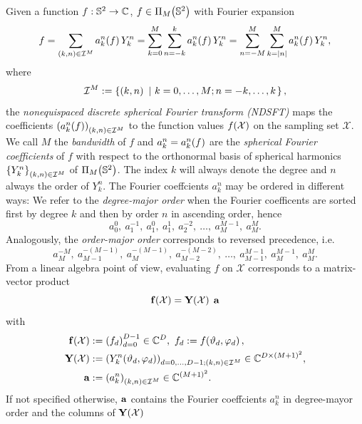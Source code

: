 Given a function $f: \mathbb{S}^2 \rightarrow \mathbb{C}$, $f \in \Pi_{M}{\hspace{-0.4ex}}\left(\mathbb{S}^2\right)$ with Fourier expansion
\begin{equation}
  \label{NFSFT:FourierExpansion} 
  f = \sum_{\left(k,n\right) \in\mathcal{I}^M} a_k^n{\hspace{-0.4ex}}\left(f\right) Y_{k}^n = \sum_{k=0}^M \sum_{n=-k}^k a_k^n{\hspace{-0.4ex}}\left(f\right) Y_{k}^n = \sum_{n=-M}^M \sum_{k=\left\vert n\right\vert}^M a_k^n{\hspace{-0.4ex}}\left(f\right) Y_{k}^n,
\end{equation}  
where 
$$\mathcal{I}^M := \left\{\left(k,n\right)\ \left|\ k=0,\ldots,M;n=-k,\ldots,k\right.\right\rbrace,$$
the \emph{nonequispaced discrete spherical Fourier transform (NDSFT)} maps the coefficients $\left(a_k^n{\hspace{-0.4ex}}\left(f\right)\right)_{(k,n) \in \mathcal{I}^M}$ to the function values $f{\hspace{-0.4ex}}\left(\mathcal{X}\right)$ on the sampling set $\mathcal{X}$.
We call $M$ the \emph{bandwidth} of $f$ and $a_{k}^n = a_{k}^n{\hspace{-0.4ex}}\left(f\right)$ are the \emph{spherical Fourier coefficients} of $f$ with respect to the 
orthonormal basis of spherical harmonics $\left\{Y_{k}^n\right\rbrace_{\left(k,n\right) \in\mathcal{I}^M}$ of $\Pi_{M}{\hspace{-0.4ex}}\left(\mathbb{S}^2\right)$. The index $k$ will always denote the degree and $n$ always the order of $Y_{k}^n$. The Fourier coeffcients $a_{k}^n$ may be ordered 
in different ways: We refer to the \emph{degree-major order} when the Fourier coefficents are sorted first by degree $k$ and then by order $n$ in ascending order, hence
$$ a_{0}^0,\: a_{1}^{-1},\: a_{1}^{0},\: a_{1}^{1},\: a_{2}^{-2},\: \ldots,\: a_{M}^{M-1},\: a_{M}^{M}.$$ 
Analogously, the \emph{order-major order} corresponds to reversed precedence, i.e.
$$ a_{M}^{-M},\: a_{M-1}^{-(M-1)},\: a_{M}^{-(M-1)},\: a_{M-2}^{-(M-2)},\: \ldots,\: a_{M-1}^{M-1},\: a_{M}^{M-1},\: a_{M}^{M}.$$ 
From a linear algebra point of view, evaluating $f$ on $\mathcal{X}$ corresponds to a matrix-vector product
$$ \mathbf{f}{\hspace{-0.4ex}}\left(\mathcal{X}\right) = \mathbf{Y}{\hspace{-0.4ex}}\left(\mathcal{X}\right) \; \mathbf{a}$$
with
\begin{equation}
  \nonumber
  \begin{split}
    \mathbf{f}{\hspace{-0.4ex}}\left(\mathcal{X}\right) & := \left(f_d\right)_{d=0}^{D-1} \in \mathbb{C}^{D},\ f_{d} := f{\hspace{-0.4ex}}\left(\vartheta_{d},\varphi_{d}\right),\\
    \mathbf{Y}{\hspace{-0.4ex}}\left(\mathcal{X}\right) & := \left(Y_k^n{\hspace{-0.4ex}}\left(\vartheta_d,\varphi_d\right)\right)_{d=0,\ldots,D-1; \left(k,n\right) \in \mathcal{I}^M} \in \mathbb{C}^{D \times \left(M+1\right)^2},\\
    \mathbf{a} & := \left(a_k^n\right)_{\left(k,n\right) \in \mathcal{I}^M} \in \mathbb{C}^{\left(M+1\right)^2}.
  \end{split}
\end{equation}
If not specified otherwise, $\mathbf{a}$ contains the Fourier coeffcients $a_{k}^n$ in degree-mayor order and the columns of $\mathbf{Y}{\hspace{-0.4ex}}\left(\mathcal{X}\right)$ 
